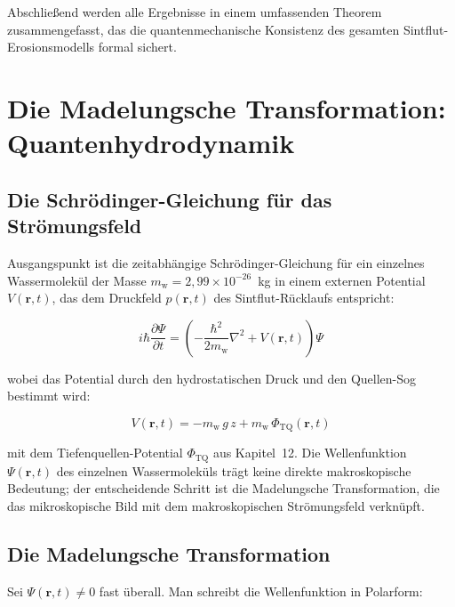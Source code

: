 ﻿\documentclass[12pt,a4paper]{report}
\begin{document}
Abschließend werden alle Ergebnisse in einem umfassenden Theorem zusammengefasst, das die quantenmechanische Konsistenz des gesamten Sintflut-Erosionsmodells formal sichert.

\section{Die Madelungsche Transformation: Quantenhydrodynamik}
\label{sec:qhd}

\subsection{Die Schrödinger-Gleichung für das Strömungsfeld}

Ausgangspunkt ist die zeitabhängige Schrödinger-Gleichung für ein einzelnes Wassermolekül der Masse $m_\mathrm{w} = 2{,}99 \times 10^{-26}$~kg in einem externen Potential $V(\mathbf{r},t)$, das dem Druckfeld $p(\mathbf{r},t)$ des Sintflut-Rücklaufs entspricht:

\begin{equation}
	i\hbar \frac{\partial \Psi}{\partial t} = \left(-\frac{\hbar^2}{2m_\mathrm{w}} \nabla^2 + V(\mathbf{r},t)\right)\Psi
	\label{eq:schroedinger_wasser}
\end{equation}

wobei das Potential durch den hydrostatischen Druck und den Quellen-Sog bestimmt wird:

\begin{equation}
	V(\mathbf{r},t) = -m_\mathrm{w}\,g\,z + m_\mathrm{w}\,\Phi_\mathrm{TQ}(\mathbf{r},t)
	\label{eq:potential_wasser}
\end{equation}

mit dem Tiefenquellen-Potential $\Phi_\mathrm{TQ}$ aus Kapitel~12. Die Wellenfunktion $\Psi(\mathbf{r},t)$ des einzelnen Wassermoleküls trägt keine direkte makroskopische Bedeutung; der entscheidende Schritt ist die Madelungsche Transformation, die das mikroskopische Bild mit dem makroskopischen Strömungsfeld verknüpft.

\subsection{Die Madelungsche Transformation}

Sei $\Psi(\mathbf{r},t) \neq 0$ fast überall. Man schreibt die Wellenfunktion in Polarform:
\end{document}
